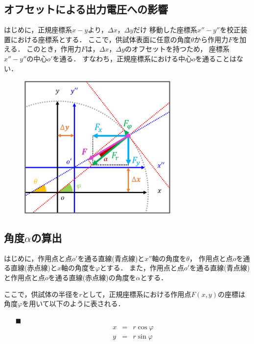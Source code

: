 \documentclass[twocolumn,a4j]{jsarticle}
\begin{document}
\newpage

\subsection{オフセットによる出力電圧への影響}

はじめに，正規座標系$x-y$より，$\Delta x$，$\Delta y$だけ
移動した座標系$x''-y''$を校正装置における座標系とする．
ここで，供試体表面に任意の角度$\theta$から作用力$F$を加える．
このとき，作用力$F$は，$\Delta x$，$\Delta y$のオフセットを持つため，
座標系$x''-y''$の中心$o'$を通る．
すなわち，正規座標系における中心$o$を通ることはない．

\begin{figure}[htbp]
    \footnotesize
    \begin{center}
        \includegraphics[width=80mm]{../images/image_6.png}
        \caption{}
    \end{center}
\end{figure}

\subsection{角度$\alpha$の算出}
はじめに，作用点と点$o'$を通る直線(青点線)と$x''$軸の角度を$\theta$，
作用点と点$o$を通る直線(赤点線)と$x$軸の角度を$\varphi$とする．
また，作用点と点$o'$を通る直線(青点線)と作用点と点$o$を通る直線(赤点線)の角度を$\alpha$とする．

ここで，供試体の半径を$r$として，正規座標系における作用点$F\left(x,y\right)$の座標は
角度$\varphi$を用いて以下のように表される．

\begin{itemize}
    \item [$\blacksquare$] 
          \begin{eqnarray*}
            x &=& r \cos \varphi\\
            y &=& r \sin \varphi\\
          \end{eqnarray*}
\end{itemize}
\end{document}
